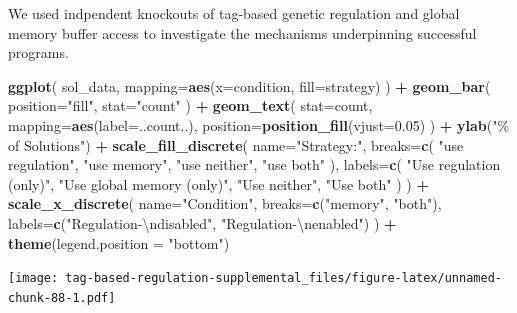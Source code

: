 \documentclass[
]{book}
\newenvironment{Shaded}{\begin{snugshade}}{\end{snugshade}}
\newcommand{\CharTok}[1]{\textcolor[rgb]{0.31,0.60,0.02}{#1}}
\newcommand{\DataTypeTok}[1]{\textcolor[rgb]{0.13,0.29,0.53}{#1}}
\newcommand{\FloatTok}[1]{\textcolor[rgb]{0.00,0.00,0.81}{#1}}
\newcommand{\KeywordTok}[1]{\textcolor[rgb]{0.13,0.29,0.53}{\textbf{#1}}}
\newcommand{\NormalTok}[1]{#1}
\newcommand{\OperatorTok}[1]{\textcolor[rgb]{0.81,0.36,0.00}{\textbf{#1}}}
\newcommand{\StringTok}[1]{\textcolor[rgb]{0.31,0.60,0.02}{#1}}
\begin{document}
We used indpendent knockouts of tag-based genetic regulation and global memory buffer access to investigate the mechanisms underpinning successful programs.

\begin{Shaded}
\begin{Highlighting}[]
\KeywordTok{ggplot}\NormalTok{( sol\_data, }\DataTypeTok{mapping=}\KeywordTok{aes}\NormalTok{(}\DataTypeTok{x=}\NormalTok{condition, }\DataTypeTok{fill=}\NormalTok{strategy) ) }\OperatorTok{+}
\StringTok{  }\KeywordTok{geom\_bar}\NormalTok{(}
    \DataTypeTok{position=}\StringTok{"fill"}\NormalTok{,}
    \DataTypeTok{stat=}\StringTok{"count"}
\NormalTok{  ) }\OperatorTok{+}
\StringTok{  }\KeywordTok{geom\_text}\NormalTok{(}
    \DataTypeTok{stat=}\StringTok{\textquotesingle{}count\textquotesingle{}}\NormalTok{,}
    \DataTypeTok{mapping=}\KeywordTok{aes}\NormalTok{(}\DataTypeTok{label=}\NormalTok{..count..),}
    \DataTypeTok{position=}\KeywordTok{position\_fill}\NormalTok{(}\DataTypeTok{vjust=}\FloatTok{0.05}\NormalTok{)}
\NormalTok{  ) }\OperatorTok{+}
\StringTok{  }\KeywordTok{ylab}\NormalTok{(}\StringTok{"\% of Solutions"}\NormalTok{) }\OperatorTok{+}
\StringTok{  }\KeywordTok{scale\_fill\_discrete}\NormalTok{(}
    \DataTypeTok{name=}\StringTok{"Strategy:"}\NormalTok{,}
    \DataTypeTok{breaks=}\KeywordTok{c}\NormalTok{(}
      \StringTok{"use regulation"}\NormalTok{,}
      \StringTok{"use memory"}\NormalTok{,}
      \StringTok{"use neither"}\NormalTok{,}
      \StringTok{"use both"}
\NormalTok{    ),}
    \DataTypeTok{labels=}\KeywordTok{c}\NormalTok{(}
      \StringTok{"Use regulation (only)"}\NormalTok{,}
      \StringTok{"Use global memory (only)"}\NormalTok{,}
      \StringTok{"Use neither"}\NormalTok{,}
      \StringTok{"Use both"}
\NormalTok{    )}
\NormalTok{  ) }\OperatorTok{+}
\StringTok{  }\KeywordTok{scale\_x\_discrete}\NormalTok{(}
    \DataTypeTok{name=}\StringTok{"Condition"}\NormalTok{,}
    \DataTypeTok{breaks=}\KeywordTok{c}\NormalTok{(}\StringTok{"memory"}\NormalTok{, }\StringTok{"both"}\NormalTok{),}
    \DataTypeTok{labels=}\KeywordTok{c}\NormalTok{(}\StringTok{"Regulation{-}}\CharTok{\textbackslash{}n}\StringTok{disabled"}\NormalTok{, }\StringTok{"Regulation{-}}\CharTok{\textbackslash{}n}\StringTok{enabled"}\NormalTok{)}
\NormalTok{  ) }\OperatorTok{+}
\StringTok{  }\KeywordTok{theme}\NormalTok{(}\DataTypeTok{legend.position =} \StringTok{"bottom"}\NormalTok{)}
\end{Highlighting}
\end{Shaded}

\texttt{[image: tag-based-regulation-supplemental\_files/figure-latex/unnamed-chunk-88-1.pdf]}
\end{document}
